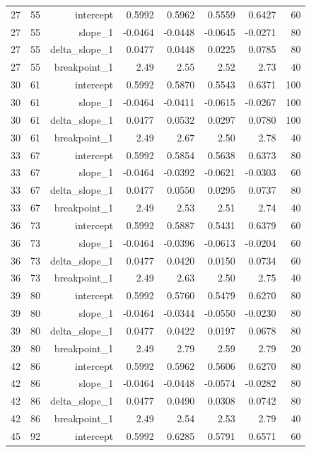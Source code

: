 {\begin{longtable}{lrrrrrrr}
  27 & 55 & intercept & 0.5992 & 0.5962 & 0.5559 & 0.6427 & 60 \\
  27 & 55 & slope\_1 & -0.0464 & -0.0448 & -0.0645 & -0.0271 & 80 \\
  27 & 55 & delta\_slope\_1 & 0.0477 & 0.0448 & 0.0225 & 0.0785 & 80 \\
  27 & 55 & breakpoint\_1 & 2.49 & 2.55 & 2.52 & 2.73 & 40 \\
  30 & 61 & intercept & 0.5992 & 0.5870 & 0.5543 & 0.6371 & 100 \\
  30 & 61 & slope\_1 & -0.0464 & -0.0411 & -0.0615 & -0.0267 & 100 \\
  30 & 61 & delta\_slope\_1 & 0.0477 & 0.0532 & 0.0297 & 0.0780 & 100 \\
  30 & 61 & breakpoint\_1 & 2.49 & 2.67 & 2.50 & 2.78 & 40 \\
  33 & 67 & intercept & 0.5992 & 0.5854 & 0.5638 & 0.6373 & 80 \\
  33 & 67 & slope\_1 & -0.0464 & -0.0392 & -0.0621 & -0.0303 & 60 \\
  33 & 67 & delta\_slope\_1 & 0.0477 & 0.0550 & 0.0295 & 0.0737 & 80 \\
  33 & 67 & breakpoint\_1 & 2.49 & 2.53 & 2.51 & 2.74 & 40 \\
  36 & 73 & intercept & 0.5992 & 0.5887 & 0.5431 & 0.6379 & 60 \\
  36 & 73 & slope\_1 & -0.0464 & -0.0396 & -0.0613 & -0.0204 & 60 \\
  36 & 73 & delta\_slope\_1 & 0.0477 & 0.0420 & 0.0150 & 0.0734 & 60 \\
  36 & 73 & breakpoint\_1 & 2.49 & 2.63 & 2.50 & 2.75 & 40 \\
  39 & 80 & intercept & 0.5992 & 0.5760 & 0.5479 & 0.6270 & 80 \\
  39 & 80 & slope\_1 & -0.0464 & -0.0344 & -0.0550 & -0.0230 & 80 \\
  39 & 80 & delta\_slope\_1 & 0.0477 & 0.0422 & 0.0197 & 0.0678 & 80 \\
  39 & 80 & breakpoint\_1 & 2.49 & 2.79 & 2.59 & 2.79 & 20 \\
  42 & 86 & intercept & 0.5992 & 0.5962 & 0.5606 & 0.6270 & 80 \\
  42 & 86 & slope\_1 & -0.0464 & -0.0448 & -0.0574 & -0.0282 & 80 \\
  42 & 86 & delta\_slope\_1 & 0.0477 & 0.0490 & 0.0308 & 0.0742 & 80 \\
  42 & 86 & breakpoint\_1 & 2.49 & 2.54 & 2.53 & 2.79 & 40 \\
  45 & 92 & intercept & 0.5992 & 0.6285 & 0.5791 & 0.6571 & 60 \\

\end{longtable}}
